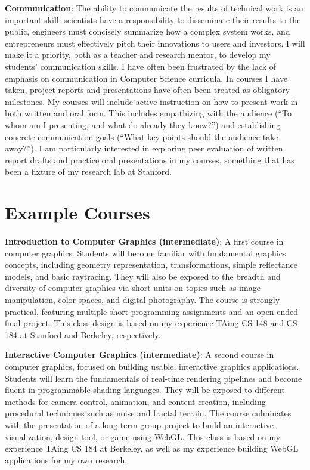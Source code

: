 \documentclass[
10pt, %
a4paper, %
oneside, %
headinclude,footinclude, %
BCOR5mm, %
]{scrartcl}
\begin{document}
\textbf{Communication}:
The ability to communicate the results of technical work is an important skill: scientists have a responsibility to disseminate their results to the public, engineers must concisely summarize how a complex system works, and entrepreneurs must effectively pitch their innovations to users and investors.
I will make it a priority, both as a teacher and research mentor, to develop my students' communication skills. I have often been frustrated by the lack of emphasis on communication in Computer Science curricula. In courses I have taken, project reports and presentations have often been treated as obligatory milestones. My courses will include active instruction on how to present work in both written and oral form. This includes empathizing with the audience (``To whom am I presenting, and what do already they know?'') and establishing concrete communication goals (``What key points should the audience take away?''). I am particularly interested in exploring peer evaluation of written report drafts and practice oral presentations in my courses, something that has been a fixture of my research lab at Stanford. 


\section*{Example Courses}

\textbf{Introduction to Computer Graphics (intermediate)}:
A first course in computer graphics. Students will become familiar with fundamental graphics concepts, including geometry representation, transformations, simple reflectance models, and basic raytracing. They will also be exposed to the breadth and diversity of computer graphics via short units on topics such as image manipulation, color spaces, and digital photography. The course is strongly practical, featuring multiple short programming assignments and an open-ended final project. This class design is based on my experience TAing CS 148 and CS 184 at Stanford and Berkeley, respectively.

\textbf{Interactive Computer Graphics (intermediate)}:
A second course in computer graphics, focused on building usable, interactive graphics applications. Students will learn the fundamentals of real-time rendering pipelines and become fluent in programmable shading languages. They will be exposed to different methods for camera control, animation, and content creation, including procedural techniques such as noise and fractal terrain. The course culminates with the presentation of a long-term group project to build an interactive visualization, design tool, or game using WebGL. This class is based on my experience TAing CS 184 at Berkeley, as well as my experience building WebGL applications for my own research.
\end{document}
